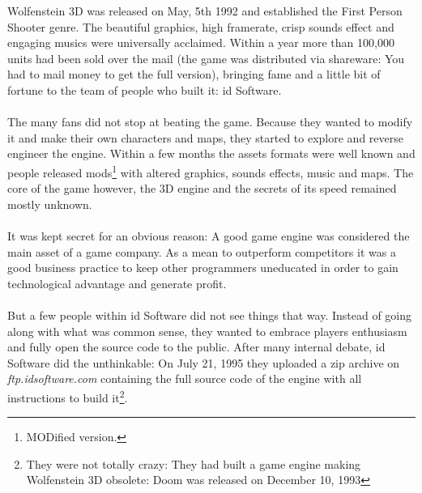 Wolfenstein 3D was released on May, 5th 1992 and established the First Person Shooter genre. The beautiful graphics, high framerate, crisp sounds effect and engaging musics were universally acclaimed. Within a year more than 100,000 units had been sold over the mail (the game was distributed via shareware: You had to mail money to get the full version), bringing fame and a little bit of fortune to the team of people who built it: id Software.\\
\\
The many fans did not stop at beating the game. Because they wanted to modify it and make their own characters and maps, they started to explore and reverse engineer the engine. Within a few months the assets formats were well known and people released mods\footnote{MODified version.} with altered graphics, sounds effects, music and maps. The core of the game however, the 3D engine and the secrets of its speed remained mostly unknown.\\
\\
It was kept secret for an obvious reason: A good game engine was considered the main asset of a game company. As a mean to outperform competitors it was a good business practice to keep other programmers  uneducated in order to gain technological advantage and generate profit.\\
\\
But a few people within id Software did not see things that way. Instead of going along with what was common sense, they wanted to embrace players enthusiasm and fully open the source code to the public. After many internal debate, id Software did the unthinkable: On July 21, 1995 they uploaded a zip archive on \emph{ftp.idsoftware.com} containing the full source code of the engine with all instructions to build it\footnote{They were not totally crazy: They had built a game engine making Wolfenstein 3D obsolete: Doom was released on December 10, 1993}.\\

